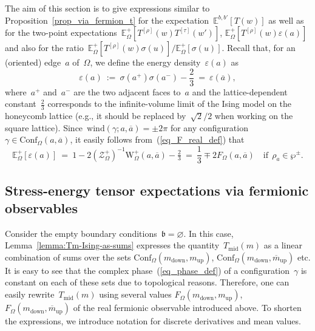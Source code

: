 \documentclass[reqno,11pt,a4paper]{amsart}
\theoremstyle{remark}
\newcommand{\Tm}{T_{\mathrm{mid}}}        \newcommand{\Cm}{c_{\mathrm{mid}}}
\newcommand{\Trho}{T^{[\rho]}}
\newcommand{\Ttau}{T^{[\tau]}}
\renewcommand{\b}{\mathfrak{b}}
\newcommand{\dob}{{b,b'}}
\newcommand{\E}{\mathbb{E}_\Omega}
\newcommand{\wind}{\mathrm{wind}}
\newcommand{\F}{F_\Omega}       \newcommand{\Fdelta}{F_{\Omega_\delta}}
\newcommand{\conf}{\mathrm{Conf}}
\newcommand\ConfO[1]{\conf_\Omega(#1)}
\def\cZ{\mathcal Z}
\def\Weight{\mathrm{W}}
\begin{document}
The aim of this section is to give expressions similar to Proposition~\ref{prop_via_fermion_t} for the expectation~$\mathbb{E}^\dob[T(w)]$ as well as for the two-point expectations~$\E^+[\Trho(w)\Ttau(w')]$, $\E^+[\Trho(w)\varepsilon(a)]$ and also for the ratio~$\E^+[\Trho(w)\sigma(u)]/\E^+[\sigma(u)]$. Recall that, for an (oriented) edge~$a$ of~$\Omega$, we define the energy density~$\varepsilon(a)$ as
\begin{equation}
\label{eq_e_definition}
\varepsilon(a)~:=~\sigma(a^+)\sigma(a^-)-\textstyle{\frac{2}{3}} ~=~ \varepsilon(\overline{a}),
\end{equation}
where~$a^+$ and~$a^-$ are the two adjacent faces to~$a$ and the lattice-dependent constant~$\frac{2}{3}$ corresponds to the infinite-volume limit of the Ising model on the honeycomb lattice (e.g., it should be replaced by~$\sqrt{2}/2$ when working on the square lattice). Since~$\wind(\gamma;a,\overline{a})=\pm 2\pi$ for any configuration~$\gamma\in\ConfO{a,\overline{a}}$, it easily follows from~(\ref{eq_F_real_def}) that
\begin{equation}
\label{eq_e_via_fermion}
\E^+[\varepsilon(a)] ~=~ 1-2(\cZ_\Omega^+)^{-1}\Weight_\Omega^+(a,\overline{a})-\tfrac{2}{3} ~=~ {\textstyle{\frac{1}{3}}}\mp 2\F(a,\overline{a})\quad \text{if}\ \ \rho_a\in\wp^\pm.
\end{equation}


\subsection{Stress-energy tensor expectations via fermionic observables} \label{sub:T-via-fermionic}

Consider the empty boundary conditions~$\b=\varnothing$. In this case, Lemma~\ref{lemma:Tm-Ising-as-sums} expresses the quantity~$\Tm(m)$ as a linear combination of sums over the sets $\ConfO{m_{\mathrm{down}},m_{\mathrm{up}}}$, $\ConfO{m_{\mathrm{down}},\overline{m}_{\mathrm{up}}}$ etc. It is easy to see that the complex phase~(\ref{eq_phase_def}) of a configuration~$\gamma$ is constant on each of these sets due to topological reasons. Therefore, one can easily rewrite~$\Tm(m)$ using several values $\F(m_{\mathrm{down}},m_{\mathrm{up}})$, $\F(m_{\mathrm{down}},\overline{m}_{\mathrm{up}})$ of the real fermionic observable introduced above.
To shorten the expressions, we introduce notation for discrete derivatives and mean values.
\end{document}

